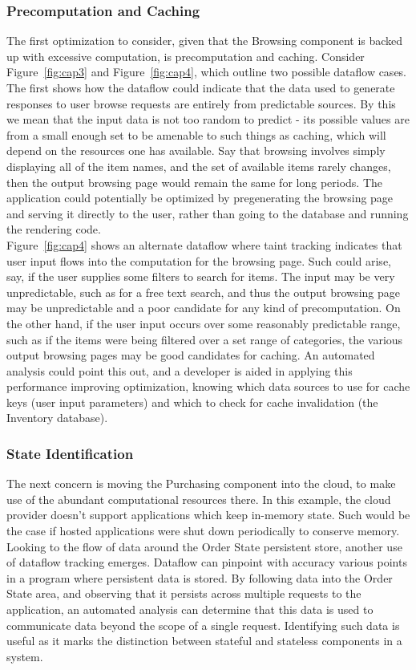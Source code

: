 \documentclass[msc,oneside]{ubcthesis}
\begin{document}
\subsubsection{Precomputation and Caching}
The first optimization to consider, given that the Browsing component is backed up with excessive computation, is precomputation and caching. Consider Figure~\ref{fig:cap3} and Figure~\ref{fig:cap4}, which outline two possible dataflow cases. The first shows how the dataflow could indicate that the data used to generate responses to user browse requests are entirely from predictable sources. By this we mean that the input data is not too random to predict - its possible values are from a small enough set to be amenable to such things as caching, which will depend on the resources one has available. Say that browsing involves simply displaying all of the item names, and the set of available items rarely changes, then the output browsing page would remain the same for long periods. The application could potentially be optimized by pregenerating the browsing page and serving it directly to the user, rather than going to the database and running the rendering code.\\

Figure~\ref{fig:cap4} shows an alternate dataflow where taint tracking indicates that user input flows into the computation for the browsing page. Such could arise, say, if the user supplies some filters to search for items. The input may be very unpredictable, such as for a free text search, and thus the output browsing page may be unpredictable and a poor candidate for any kind of precomputation. On the other hand, if the user input occurs over some reasonably predictable range, such as if the items were being filtered over a set range of categories, the various output browsing pages may be good candidates for caching. An automated analysis could point this out, and a developer is aided in applying this performance improving optimization, knowing which data sources to use for cache keys (user input parameters) and which to check for cache invalidation (the Inventory database).

\subsubsection{State Identification}
The next concern is moving the Purchasing component into the cloud, to make use of the abundant computational resources there. In this example, the cloud provider doesn't support applications which keep in-memory state. Such would be the case if hosted applications were shut down periodically to conserve memory. Looking to the flow of data around the Order State persistent store, another use of dataflow tracking emerges. Dataflow can pinpoint with accuracy various points in a program where persistent data is stored. By following data into the Order State area, and observing that it persists across multiple requests to the application, an automated analysis can determine that this data is used to communicate data beyond the scope of a single request. Identifying such data is useful as it marks the distinction between stateful and stateless components in a system.
\end{document}
